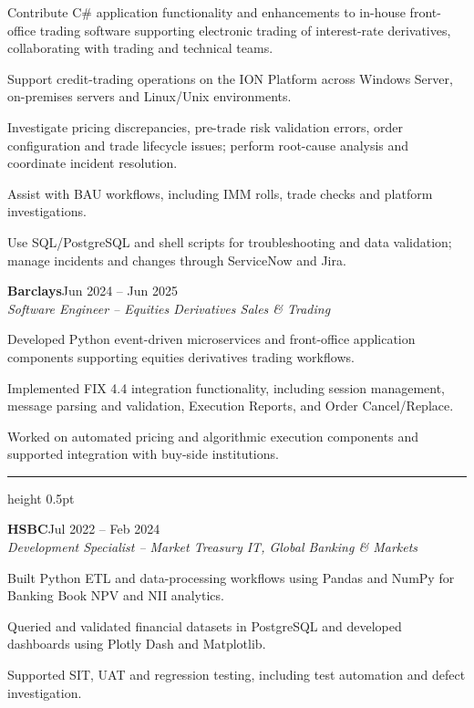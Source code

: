 \documentclass[10pt,a4paper]{article}
\newcommand{\ressection}[1]{%
  \vspace{12pt}{\large\bfseries\color{accent}#1}\par
  \vspace{4pt}\hrule height 0.5pt\vspace{7pt}}
\newcommand{\job}[4]{%
  \vspace{7pt}\textbf{#1}\hfill{\small #2}\\[1pt]
  \textit{#3}\hfill{\small\color{muted}#4}\par\vspace{2pt}}
\newenvironment{bullets}{%
  \begin{list}{\textbullet}{%
    \setlength{\leftmargin}{14pt}%
    \setlength{\labelwidth}{8pt}%
    \setlength{\labelsep}{5pt}%
    \setlength{\itemsep}{4pt}%
    \setlength{\topsep}{4pt}%
    \setlength{\parsep}{0pt}%
    \setlength{\partopsep}{0pt}%
  }%
}{\end{list}\vspace{3pt}}
\begin{document}
\begin{bullets}
  \item Contribute C\# application functionality and enhancements to in-house front-office trading software supporting electronic trading of interest-rate derivatives, collaborating with trading and technical teams.
  \item Support credit-trading operations on the ION Platform across Windows Server, on-premises servers and Linux/Unix environments.
  \item Investigate pricing discrepancies, pre-trade risk validation errors, order configuration and trade lifecycle issues; perform root-cause analysis and coordinate incident resolution.
  \item Assist with BAU workflows, including IMM rolls, trade checks and platform investigations.
  \item Use SQL/PostgreSQL and shell scripts for troubleshooting and data validation; manage incidents and changes through ServiceNow and Jira.
\end{bullets}

\job{Barclays}{Jun 2024 -- Jun 2025}{Software Engineer -- Equities Derivatives Sales \& Trading}{}

\begin{bullets}
  \item Developed Python event-driven microservices and front-office application components supporting equities derivatives trading workflows.
  \item Implemented FIX 4.4 integration functionality, including session management, message parsing and validation, Execution Reports, and Order Cancel/Replace.
  \item Worked on automated pricing and algorithmic execution components and supported integration with buy-side institutions.
\end{bullets}

\newpage

\ressection{PROFESSIONAL EXPERIENCE (CONTINUED)}

\job{HSBC}{Jul 2022 -- Feb 2024}{Development Specialist -- Market Treasury IT, Global Banking \& Markets}{}

\begin{bullets}
  \item Built Python ETL and data-processing workflows using Pandas and NumPy for Banking Book NPV and NII analytics.
  \item Queried and validated financial datasets in PostgreSQL and developed dashboards using Plotly Dash and Matplotlib.
  \item Supported SIT, UAT and regression testing, including test automation and defect investigation.
\end{bullets}
\end{document}
